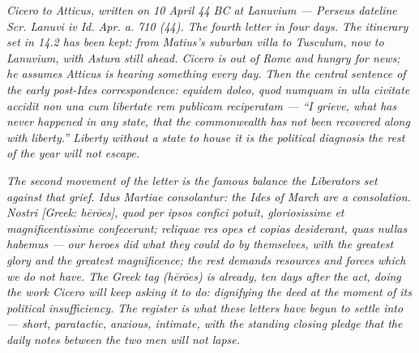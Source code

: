 
\textit{Cicero to Atticus, written on 10 April 44 BC at Lanuvium
--- Perseus dateline \textit{Scr. Lanuvi iv Id. Apr. a. 710 (44)}.
The fourth letter in four days. The itinerary set in 14.2 has
been kept: from Matius's suburban villa to Tusculum, now to
Lanuvium, with Astura still ahead. Cicero is out of Rome and
hungry for news; he assumes Atticus is hearing something every
day. Then the central sentence of the early post-Ides
correspondence: \textit{equidem doleo, quod numquam in ulla
civitate accidit non una cum libertate rem publicam reciperatam}
--- ``I grieve, what has never happened in any state, that the
commonwealth has not been recovered along with liberty.''
Liberty without a state to house it is the political diagnosis
the rest of the year will not escape.}

\textit{The second movement of the letter is the famous balance
the Liberators set against that grief. \textit{Idus Martiae
consolantur}: the Ides of March are a consolation. \textit{Nostri
\textit{[Greek: hērōes]}, quod per ipsos confici potuit,
gloriosissime et magnificentissime confecerunt; reliquae res
opes et copias desiderant, quas nullas habemus} --- our heroes
did what they could do by themselves, with the greatest glory
and the greatest magnificence; the rest demands resources and
forces which we do not have. The Greek tag (\textit{hērōes}) is
already, ten days after the act, doing the work Cicero will keep
asking it to do: dignifying the deed at the moment of its
political insufficiency. The register is what these letters
have begun to settle into --- short, paratactic, anxious,
intimate, with the standing closing pledge that the daily notes
between the two men will not lapse.}
